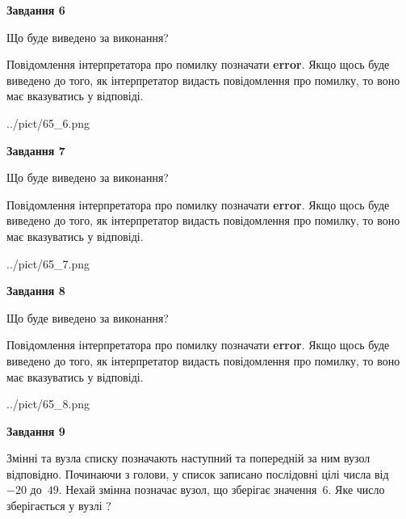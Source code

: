 \documentclass[12pt, ukrainian]{article}
\begin{document}
{\begin {large}
{\begin {center}\textbf{Завдання 6}\end {center}}\par
Що буде виведено за виконання?

Повідомлення інтерпретатора про помилку позначати \textbf{error}.
Якщо щось буде виведено до того, як інтерпретатор видасть повідомлення про помилку, 
то воно має вказуватись у відповіді. \par


\begin{center}
	{../pict/65_6.png}
\end{center}
\newpage

{\begin {center}\textbf{Завдання 7}\end {center}}\par
Що буде виведено за виконання?

Повідомлення інтерпретатора про помилку позначати \textbf{error}.
Якщо щось буде виведено до того, як інтерпретатор видасть повідомлення про помилку, 
то воно має вказуватись у відповіді. \par


\begin{center}
	{../pict/65_7.png}
\end{center}
\newpage

{\begin {center}\textbf{Завдання 8}\end {center}}\par
Що буде виведено за виконання?

Повідомлення інтерпретатора про помилку позначати \textbf{error}.
Якщо щось буде виведено до того, як інтерпретатор видасть повідомлення про помилку, 
то воно має вказуватись у відповіді. \par


\begin{center}
	{../pict/65_8.png}
\end{center}
\newpage

{\begin {center}\textbf{Завдання 9}\end {center}}\par
Змінні  та  вузла списку позначають наступний та попередній за ним вузол відповідно. Починаючи з голови, у список записано послідовні цілі числа від~$-20$ до~$49$. Нехай змінна  позначає вузол, що зберігає значення~$6$.
Яке число зберігається у вузлі  ?\par
\newpage


\end{large}}
\end{document}
